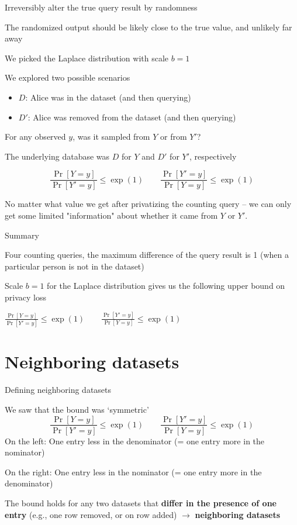 \documentclass[12pt,aspectratio=169,handout]{beamer}
\begin{document}
\begin{frame}{Irreversibly alter the true query result by randomness}

The randomized output should be likely close to the true value, and unlikely far away

We picked the Laplace distribution with scale $b = 1$

We explored two possible scenarios
\begin{itemize}
	\item $D$: Alice was in the dataset (and then querying)
	\item $D'$: Alice was removed from the dataset (and then querying)
\end{itemize}

\end{frame}


\begin{frame}{For any observed $y$, was it sampled from $Y$ or from $Y'$?}

The underlying database was $D$ for $Y$ and $D'$ for $Y'$, respectively

$$
\frac{\Pr[Y = y]}{\Pr[Y' = y]} \leq \exp(1) \qquad
\frac{\Pr[Y' = y]}{\Pr[Y = y]} \leq \exp(1)
$$

No matter what value we get after privatizing the counting query -- we can only get some limited "information" about whether it came from $Y$ or $Y'$.

\end{frame}



\begin{frame}{Summary}

Four counting queries, the maximum difference of the query result is 1 (when a particular person is not in the dataset)

Scale $b = 1$ for the Laplace distribution gives us the following upper bound on privacy loss

$
\frac{\Pr[Y = y]}{\Pr[Y' = y]} \leq \exp(1) \qquad
\frac{\Pr[Y' = y]}{\Pr[Y = y]} \leq \exp(1)
$

\end{frame}


\section{Neighboring datasets}

\begin{frame}{Defining neighboring datasets}
	
We saw that the bound was `symmetric'
$$
\frac{\Pr[Y = y]}{\Pr[Y' = y]} \leq \exp(1) \qquad
\frac{\Pr[Y' = y]}{\Pr[Y = y]} \leq \exp(1)
$$
On the left: One entry less in the denominator (= one entry more in the nominator)

On the right: One entry less in the nominator (= one entry more in the denominator)

The bound holds for any two datasets that \textbf{differ in the presence of one entry} (e.g., one row removed, or on row added) $\rightarrow$ \textbf{neighboring datasets}


\end{frame}
\end{document}

